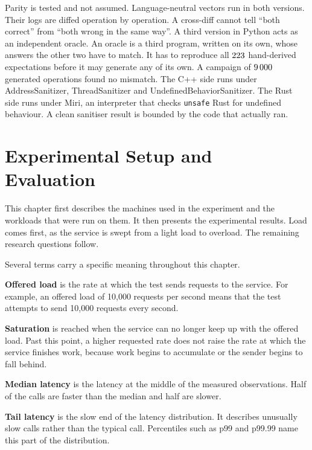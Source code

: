 \documentclass[english,oneside,a4paper,censored,csm,software-track-2020]{HYthesisML}
\begin{document}
Parity is tested and not assumed. Language-neutral vectors run in both
versions. Their logs are diffed operation by operation. A cross-diff cannot tell ``both
correct'' from ``both wrong in the same way''. A third version in Python acts
as an independent oracle. An
oracle is a third program, written on its own, whose answers the other two have to match.
It has to reproduce all $223$ hand-derived
expectations before it may generate any of its own. A campaign of
$9\,000$ generated operations found no mismatch. The C++ side runs under
AddressSanitizer, ThreadSanitizer and UndefinedBehaviorSanitizer. The Rust
side runs under Miri, an interpreter that checks \texttt{unsafe} Rust for
undefined behaviour. A clean sanitiser result is bounded by the code that
actually ran.

\chapter{Experimental Setup and Evaluation\label{chapter:eval}}

This chapter first describes the machines used in the experiment and 
the workloads that were run on them. It then presents the experimental results. 
Load comes first, as the service is swept from a light load to
overload. The remaining research questions follow.


Several terms carry a specific meaning throughout this chapter.

\textbf{Offered load} is the rate at which the test sends requests to the
service. For example, an offered load of 10{,}000 requests per second means
that the test attempts to send 10{,}000 requests every second.

\textbf{Saturation} is reached when the service can no longer keep up with the
offered load. Past this point, a higher requested rate does not raise the rate
at which the service finishes work, because work begins to accumulate or the
sender begins to fall behind.

\textbf{Median latency} is the latency at the middle of the measured
observations. Half of the calls are faster than the median and half are slower.

\textbf{Tail latency} is the slow end of the latency distribution. It
describes unusually slow calls rather than the typical call. Percentiles such
as p99 and p99.99 name this part of the distribution.
\end{document}
